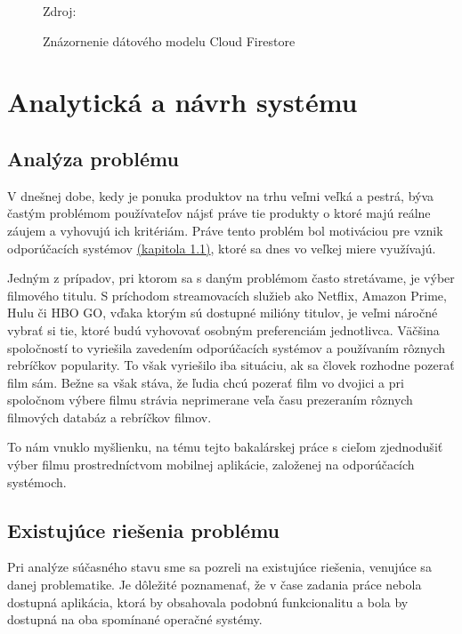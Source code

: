 \begin{figure}[!htbp]
  \centering  
  \def\stackalignment{c}
           {\scriptsize%
            Zdroj: \cite{firestoreimg}}
	\caption{Znázornenie dátového modelu Cloud Firestore} 
  \label{firestore}
\end{figure}


\section{Analytická a návrh systému}
\subsection{Analýza problému}
V dnešnej dobe, kedy je ponuka produktov na trhu veľmi veľká a pestrá, býva častým problémom používateľov nájsť práve tie produkty o ktoré majú reálne záujem a vyhovujú ich kritériám. Práve tento problém bol motiváciou pre vznik odporúčacích systémov \hyperref[sec:odporucacie systemy]{(kapitola 1.1)}, ktoré sa dnes vo veľkej miere využívajú. 

Jedným z prípadov, pri ktorom sa s daným problémom často stretávame, je výber filmového titulu. S príchodom streamovacích služieb ako Netflix, Amazon Prime, Hulu či HBO GO, vďaka ktorým sú dostupné milióny titulov, je veľmi náročné vybrať si tie, ktoré budú vyhovovať osobným preferenciám jednotlivca. Väčšina spoločností to vyriešila zavedením odporúčacích systémov a používaním rôznych rebríčkov popularity. To však vyriešilo iba situáciu, ak sa človek rozhodne pozerať film sám. Bežne sa však stáva, že ľudia chcú pozerať film vo dvojici a pri spoločnom výbere filmu strávia neprimerane veľa času prezeraním rôznych filmových databáz a rebríčkov filmov. 

To nám vnuklo myšlienku, na tému tejto bakalárskej práce s cieľom zjednodušiť výber filmu  prostredníctvom mobilnej aplikácie, založenej na odporúčacích systémoch.

\subsection{Existujúce riešenia problému}
Pri analýze súčasného stavu sme sa pozreli na existujúce riešenia, venujúce sa danej problematike. Je dôležité poznamenať, že v čase zadania práce nebola dostupná aplikácia, ktorá by obsahovala podobnú funkcionalitu a bola by dostupná na oba spomínané operačné systémy. 
